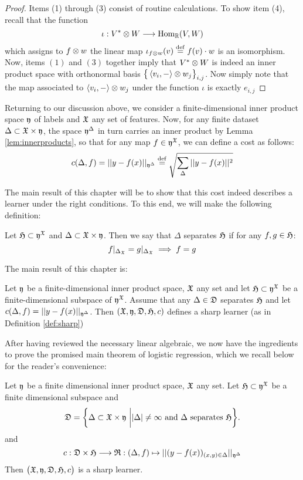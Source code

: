 \begin{proof}
Items (1) through (3) consist of routine calculations. To show item (4), recall that the function
\[
\iota: V^*\otimes W \longrightarrow \operatorname{Hom}_{\mathbb{R}}(V,W)
\]
which assigns to $f\otimes w$ the linear map $\iota_{f\otimes w}(v)\stackrel{\operatorname{def}}{=} f(v)\cdot w$ is an isomorphism. Now, items $(1)$ and $(3)$ together imply that $V^*\otimes W$ is indeed an inner product space with  orthonormal basis $\big\{\left\langle v_i,-\right\rangle\otimes w_j\big\}_{i,j}$. Now simply note that the map associated to $\left\langle v_i,-\right\rangle\otimes w_j$ under the function $\iota$ is exactly $e_{i,j}$
\end{proof}	
	
Returning to our discussion above, we consider a finite-dimensional inner product space $\mathfrak{y}$ of labels and $\mathfrak{X}$ any set of features. Now, for any finite dataset $\Delta\subset \mathfrak{X}\times \mathfrak{y}$, the space $\mathfrak{y}^\Delta$ in turn carries an inner product by Lemma \ref{lem:innerproducts}, so that for any map $f \in \mathfrak{y}^{\mathfrak{X}}$, we can define a cost as follows:
\[
c(\Delta,f)=\vert \vert y-f(x)\vert\vert_{\mathfrak{y}^\Delta}\stackrel{\operatorname{def}}{=}\sqrt{\sum_{\Delta} \vert \vert y-f(x)\vert \vert^2}
\]

The main result of this chapter will be to show that this cost indeed describes a learner under the right conditions. To this end, we will make the following definition:
\begin{definition}
Let $\mathfrak{H}\subset \mathfrak{y}^{\mathfrak{X}}$ and $\Delta \subset \mathfrak{X}\times \mathfrak{y}$. Then we say that $\Delta$ separates $\mathfrak{H}$ if for any $f,g \in \mathfrak{H}$:
\[
f\arrowvert_{\Delta_{\mathfrak{X}}}=g\arrowvert_{{\Delta}_{\mathfrak{X}}}\implies f=g
\]
\end{definition}
The main result of this chapter is: 
\begin{theorem}\label{thm:linearlearner}
Let $\mathfrak{y}$ be a finite-dimensional inner product space, $\mathfrak{X}$ any set and let $\mathfrak{H}\subset \mathfrak{y}^{\mathfrak{X}}$ be a finite-dimensional subspace of $\mathfrak{y}^{\mathfrak{X}}$.  Assume that  any $\Delta \in \mathfrak{D}$ separates $\mathfrak{H}$ and let $c(\Delta,f)= \vert\vert y-f(x)\vert \vert_{\mathfrak{y}^\Delta}$. Then $(\mathfrak{X},\mathfrak{y},\mathfrak{D},\mathfrak{H},c)$ defines a sharp learner (as in Definition \ref{def:sharp})
\end{theorem}

\noindent After having reviewed the necessary linear algebraic, we now have the ingredients to prove the promised main theorem of logistic regression, which we recall below for the reader's convenience: 
\begin{theorem}\label{thm:linearregression}
Let $\mathfrak{y}$ be a finite dimensional inner product space,  $\mathfrak{X}$ any set. Let $\mathfrak{H}\subset \mathfrak{y}^{\mathfrak{X}}$ be a finite dimensional subspace and \[
\mathfrak{D}=\bigg\{ \Delta \subset \mathfrak{X}\times \mathfrak{y}\, \, \bigg\vert \vert  \Delta \vert \neq \infty \textrm{ and } \Delta \textrm{ separates }\mathfrak{H} \bigg\}.
\]
and 
\[c: \mathfrak{D}\times \mathfrak{H}\longrightarrow \mathfrak{R}: (\Delta,f)\mapsto \vert \vert (y-f(x))_{(x,y)\in \Delta}\vert \vert_{\mathfrak{y}^\Delta}
\]
Then $\big(\mathfrak{X},\mathfrak{y},\mathfrak{D},\mathfrak{H},c\big)$ is a sharp learner.\\
\end{theorem}



